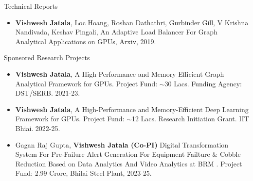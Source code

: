 \documentclass{resume} %
\begin{document}
\begin{rSection}{Technical Reports}
\begin{itemize}
\item \textbf{Vishwesh Jatala}, Loc Hoang, Roshan Dathathri, Gurbinder Gill, V Krishna Nandivada, Keshav Pingali, An Adaptive Load Balancer For Graph Analytical Applications on GPUs, Arxiv, 2019. 
\end{itemize}
\end{rSection}


\begin{rSection}{Sponsored Research Projects}
	\begin{itemize}
		\item \textbf{Vishwesh Jatala}, A High-Performance and Memory Efficient Graph Analytical Framework for GPUs. Project Fund: $\sim$30 Lacs. Funding Agency: DST/SERB. 2021-23.
		\item \textbf{Vishwesh Jatala}, A High-Performance and Memory-Efficient Deep Learning Framework for GPUs. Project Fund: $\sim$12 Lacs. Research Initiation Grant. IIT Bhiai. 2022-25.
		\item Gagan Raj Gupta, \textbf{Vishwesh Jatala (Co-PI)} Digital Transformation System For Pre-Failure Alert Generation For Equipment Failture \& Cobble Reduction Based on Data Analytics And Video Analytics at BRM . Project Fund: 2.99 Crore, Bhilai Steel Plant, 2023-25.
	\end{itemize}
\end{rSection}
\end{document}
